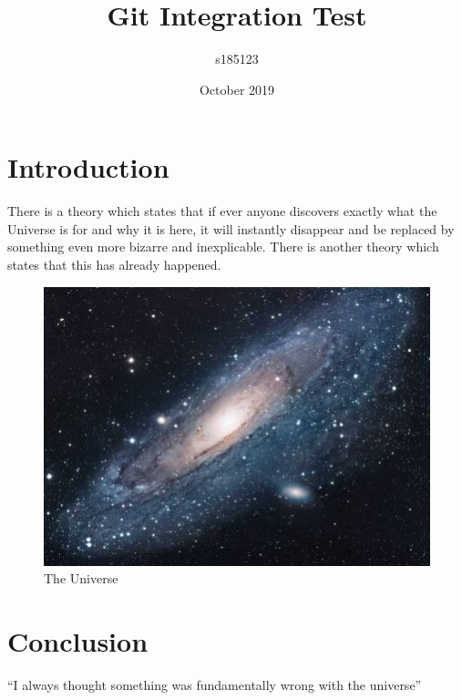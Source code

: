 \documentclass{article}
\title{Git Integration Test}
\author{s185123 }
\date{October 2019}
\begin{document}
\maketitle

\section{Introduction}
There is a theory which states that if ever anyone discovers exactly what the Universe is for and why it is here, it will instantly disappear and be replaced by something even more bizarre and inexplicable.
There is another theory which states that this has already happened.

\begin{figure}[h!]
\centering
\includegraphics[scale=1.7]{universe}
\caption{The Universe}
\label{fig:universe}
\end{figure}

\section{Conclusion}
``I always thought something was fundamentally wrong with the universe'' \citep{adams1995hitchhiker}



\end{document}
